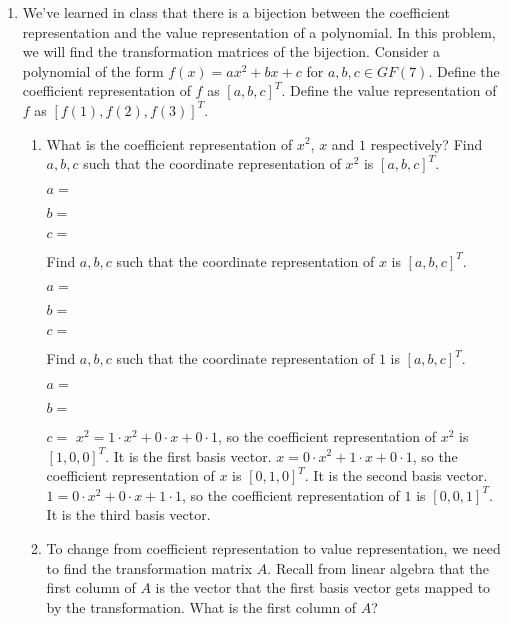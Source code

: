 \documentclass[11pt, preview]{standalone} %
\begin{document}
\begin{enumerate}
\item We've learned in class that there is a bijection between the coefficient representation and the value representation of a polynomial.
In this problem, we will find the transformation matrices of the bijection.
Consider a polynomial of the form $f(x) = ax^2+bx +c$ for $a,b,c\in GF(7)$.
Define the coefficient representation of $f$ as $[a, b, c]^T$. Define the value representation of $f$ as $[f(1), f(2), f(3)]^T$.
\begin{enumerate}
\item What is the coefficient representation of $x^2$, $x$ and $1$ respectively?
  Find $a, b, c$ such that the coordinate representation of $x^2$ is $[a, b, c]^T$.
 \begin{Freeform}{1}
  $a = $
 \end{Freeform}
 \begin{Freeform}{0}
  $b = $
 \end{Freeform}
 \begin{Freeform}{0}
  $c = $
 \end{Freeform}
    Find $a, b, c$ such that the coordinate representation of $x$ is $[a, b, c]^T$.
 \begin{Freeform}{0}
  $a = $
 \end{Freeform}
 \begin{Freeform}{1}
  $b = $
 \end{Freeform}
 \begin{Freeform}{0}
  $c = $
 \end{Freeform}
    Find $a, b, c$ such that the coordinate representation of $1$ is $[a, b, c]^T$.
 \begin{Freeform}{0}
  $a = $
 \end{Freeform}
 \begin{Freeform}{0}
  $b = $
 \end{Freeform}
  \begin{Freeform}{1}
  $c = $
  \Solution $x^2 = 1 \cdot x^2 + 0 \cdot x + 0 \cdot 1$, so the coefficient representation of $x^2$ is $[1, 0, 0]^T$. It is the first basis vector.
$x = 0 \cdot x^2 + 1 \cdot x + 0 \cdot 1$, so the coefficient representation of $x$ is $[0, 1, 0]^T$. It is the second basis vector.
$1 = 0 \cdot x^2 + 0 \cdot x + 1 \cdot 1$, so the coefficient representation of $1$ is $[0, 0, 1]^T$. It is the third basis vector.
 \end{Freeform}
\item To change from coefficient representation to value representation, we need to find the transformation matrix $A$. Recall from linear algebra that the first column of $A$ is the vector that the first basis vector gets mapped to by the transformation. What is the first column of $A$?

\end{enumerate}
\end{enumerate}
\end{document}

